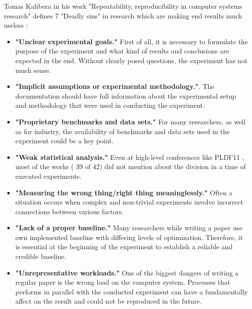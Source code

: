 Tomas Kalibera in his work\cite{DBLP:conf/popl/Vitek15} "Repeatability, reproducibility in computer systems research" defines 7 "Deadly sins" in research which are making end results much useless :
\begin{itemize}
    \item \textbf{"Unclear experimental goals."} First of all, it is necessary to formulate the purpose of the experiment and what kind of results and conclusions are expected in the end. Without clearly posed questions, the experiment has not much sense.
    \item \textbf{"Implicit assumptions or experimental methodology."}. The documentation should have full information about the experimental setup and methodology that were used in conducting the experiment.
    \item \textbf{"Proprietary benchmarks and data sets."} For many researchers, as well as for industry, the availability of benchmarks and data sets used in the experiment could be a key point.
    \item \textbf{"Weak statistical analysis."} Even at high-level conferences like PLDI’11 \cite{DBLP:conf/pldi/2011}, most of the works ( 39 of 42) did not mention about the division in a time of executed experiments.
    \item \textbf{"Measuring the wrong thing/right thing meaninglessly."} Often a situation occurs when complex and non-trivial experiments involve incorrect connections between various factors.
    \item \textbf{"Lack of a proper baseline."} Many researchers while writing a paper use own implemented baseline with differing levels of optimization. Therefore, it is essential at the beginning of the experiment to establish a reliable and credible baseline.
    \item \textbf{"Unrepresentative workloads."} One of the biggest dangers of writing a regular paper is the wrong load on the computer system. Processes that performs in parallel with the conducted experiment can have a fundamentally affect on the result and could not be reproduced in the future.
\end{itemize}
